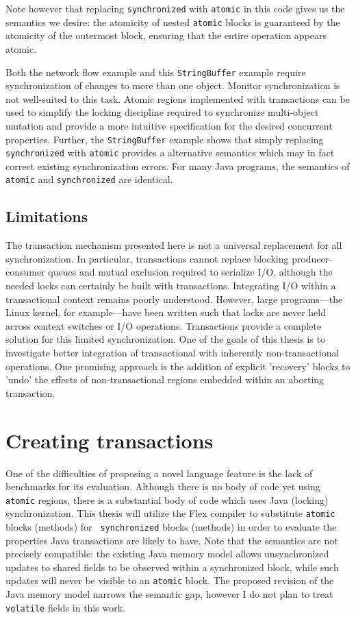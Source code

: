 \documentclass[12pt]{article}
\newcommand{\note}[1]{}%
\newcommand{\secput}[2]{\section{#2}\label{sec:#1}}
\newcommand{\subsecput}[2]{\subsection{#2}\label{sec:#1}}
\begin{document}
Note however that replacing {\tt synchronized} with {\tt atomic} in
this code gives us the semantics
we desire: the atomicity of nested {\tt atomic} blocks is guaranteed
by the atomicity of the outermost block, ensuring that the entire
operation appears atomic.

Both the network flow example and this {\tt StringBuffer} example require
synchronization of
changes to more than one object.
Monitor synchronization is not
well-suited to this task.  Atomic regions implemented with
transactions can be used to simplify the locking discipline required
to synchronize multi-object mutation
and provide a more intuitive specification for the desired
concurrent properties.  Further, the {\tt StringBuffer} example shows
that simply replacing {\tt synchronized} with {\tt atomic} provides a
alternative semantics which may in fact correct existing
synchronization errors.
For many Java programs, the
semantics of {\tt atomic} and {\tt synchronized} are identical.
\note{Can I make this rigorous?}

\subsecput{xlimit}{Limitations}
The transaction mechanism presented here is not a universal
replacement for all synchronization.  In particular, transactions
cannot replace blocking producer-consumer queues and mutual exclusion
required to serialize I/O, although the needed locks can certainly be
built with transactions.  Integrating I/O within a transactional
context remains poorly understood.  However, large programs---the
Linux kernel, for example---have been written such that locks are
never held across context switches or I/O operations.  Transactions
provide a complete solution for this limited synchronization.
One of the goals of this thesis is to investigate better integration
of transactional with inherently non-transactional operations.
One promising approach is the addition of explicit 'recovery' blocks
to 'undo' the effects of non-transactional regions embedded within
an aborting transaction.

\secput{auto}{Creating transactions}
One of the difficulties of proposing a novel language feature is the
lack of benchmarks for its evaluation.  Although there is no body of
code yet using {\tt atomic} regions, there is a substantial body of
code which uses Java (locking) synchronization.  This thesis will
utilize the Flex compiler to
substitute {\tt atomic} blocks (methods) for {\tt
  synchronized} blocks (methods) in order to evaluate the properties
Java transactions are likely to have.  Note that the semantics are not
precisely compatible: the existing Java memory model allows
unsynchronized updates to shared fields to be observed within a
synchronized block, while such updates will never be visible to an
{\tt atomic} block.  The proposed revision of the Java memory model
\cite{MansonPu02} narrows the semantic gap, however I do not
plan to treat {\tt volatile} fields in this work.
\end{document}
